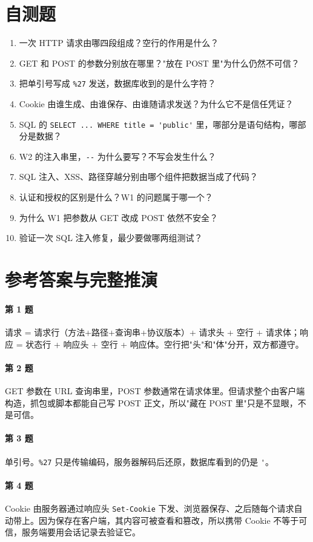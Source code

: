 \documentclass[UTF8,12pt,oneside]{ctexbook}
\begin{document}
\section{自测题}
\begin{enumerate}
\item 一次 HTTP 请求由哪四段组成？空行的作用是什么？
\item GET 和 POST 的参数分别放在哪里？"放在 POST 里"为什么仍然不可信？
\item 把单引号写成 \verb|%27| 发送，数据库收到的是什么字符？
\item Cookie 由谁生成、由谁保存、由谁随请求发送？为什么它不是信任凭证？
\item SQL 的 \verb|SELECT ... WHERE title = 'public'| 里，哪部分是语句结构，哪部分是数据？
\item W2 的注入串里，\verb|--| 为什么要写？不写会发生什么？
\item SQL 注入、XSS、路径穿越分别由哪个组件把数据当成了代码？
\item 认证和授权的区别是什么？W1 的问题属于哪一个？
\item 为什么 W1 把参数从 GET 改成 POST 依然不安全？
\item 验证一次 SQL 注入修复，最少要做哪两组测试？
\end{enumerate}

\section{参考答案与完整推演}
\paragraph{第 1 题}请求 = 请求行（方法+路径+查询串+协议版本）+ 请求头 + 空行 + 请求体；响应 = 状态行 + 响应头 + 空行 + 响应体。空行把"头"和"体"分开，双方都遵守。

\paragraph{第 2 题}GET 参数在 URL 查询串里，POST 参数通常在请求体里。但请求整个由客户端构造，抓包或脚本都能自己写 POST 正文，所以"藏在 POST 里"只是不显眼，不是可信。

\paragraph{第 3 题}单引号。\verb|%27| 只是传输编码，服务器解码后还原，数据库看到的仍是 \verb|'|。

\paragraph{第 4 题}Cookie 由服务器通过响应头 \verb|Set-Cookie| 下发、浏览器保存、之后随每个请求自动带上。因为保存在客户端，其内容可被查看和篡改，所以携带 Cookie 不等于可信，服务端要用会话记录去验证它。
\end{document}
